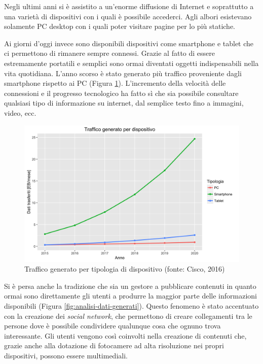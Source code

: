 Negli ultimi anni si è assistito a un'enorme diffusione di Internet e soprattutto a una varietà di dispositivi con i quali è possibile accederci. Agli albori esistevano solamente PC desktop con i quali poter visitare pagine per lo più statiche.

Ai giorni d'oggi invece sono disponibili dispositivi come smartphone e tablet che ci permettono di rimanere sempre connessi. Grazie al fatto di essere estremamente portatili e semplici sono ormai diventati oggetti indispensabili nella vita quotidiana. L'anno scorso è stato generato più traffico proveniente dagli smartphone rispetto ai PC (Figura \ref{fig:traffico-tipologia-dispositivo}). L'incremento della velocità delle connessioni e il progresso tecnologico ha fatto sì che sia possibile consultare qualsiasi tipo di informazione su internet, dal semplice testo fino a immagini, video, ecc.

\begin{figure}[ht]
	\centering
	\includegraphics[width=\textwidth]{1-introduzione/Immagini/traffico-dispositivi.png}
	\caption[Traffico generato per tipologia di dispositivo]{Traffico generato per tipologia di dispositivo (fonte: Cisco, 2016)\label{fig:traffico-tipologia-dispositivo}}
\end{figure}

Si è persa anche la tradizione che sia un gestore a pubblicare contenuti in quanto ormai sono direttamente gli utenti a produrre la maggior parte delle informazioni disponibili (Figura \ref{fig:analisi-dati-generati}). Questo fenomeno è stato accentuato con la creazione dei \emph{social network}, che permettono di creare collegamenti tra le persone dove è possibile condividere qualunque cosa che ognuno trova interessante. Gli utenti vengono così coinvolti nella creazione di contenuti che, grazie anche alla dotazione di fotocamere ad alta risoluzione nei propri dispositivi, possono essere multimediali. 

